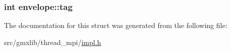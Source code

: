 \hypertarget{structenvelope_a0588b9f6a7d4702209c5a0dc1b045183}{
\subsubsection[{tag}]{\setlength{\rightskip}{0pt plus 5cm}int {\bf envelope\-::tag}}}\label{structenvelope_a0588b9f6a7d4702209c5a0dc1b045183}


\-The documentation for this struct was generated from the following file\-:\begin{DoxyCompactItemize}
\item 
src/gmxlib/thread\-\_\-mpi/\hyperlink{impl_8h}{impl.\-h}\end{DoxyCompactItemize}
